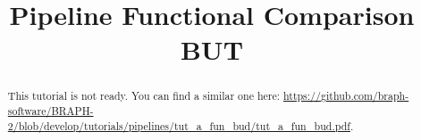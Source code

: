 \documentclass[justified]{tufte-handout}
\title{Pipeline Functional Comparison BUT}
\begin{document}
\maketitle

\begin{abstract}
\noindent
This tutorial is not ready. You can find a similar one here: \url{https://github.com/braph-software/BRAPH-2/blob/develop/tutorials/pipelines/tut_a_fun_bud/tut_a_fun_bud.pdf}.
\end{abstract}
\end{document}
